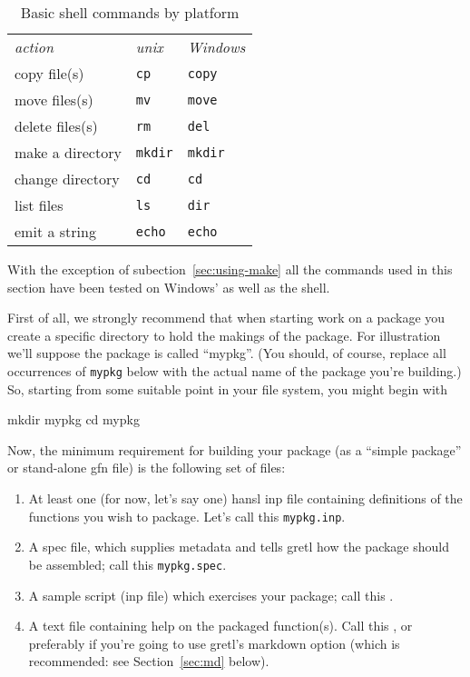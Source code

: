 \documentclass[oneside]{book}
\begin{document}
\begin{table}[htbp]
\centering
\begin{tabular}{lll}
\textit{action} & \textit{unix} & \textit{Windows} \\[4pt]
copy file(s) & \texttt{cp} & \texttt{copy} \\
move files(s) & \texttt{mv} & \texttt{move} \\
delete files(s) & \texttt{rm} & \texttt{del} \\
make a directory & \texttt{mkdir} & \texttt{mkdir} \\
change directory & \texttt{cd} & \texttt{cd} \\
list files & \texttt{ls} & \texttt{dir} \\
emit a string & \texttt{echo} & \texttt{echo}
\end{tabular}
\caption{Basic shell commands by platform}
\label{tab:basics}
\end{table}

With the exception of subection~\ref{sec:using-make} all the commands
used in this section have been tested on Windows'  as
well as the  shell.

First of all, we strongly recommend that when starting work on a
package you create a specific directory to hold the makings of the
package. For illustration we'll suppose the package is called
``mypkg''. (You should, of course, replace all occurrences of
\texttt{mypkg} below with the actual name of the package you're
building.) So, starting from some suitable point in your file system,
you might begin with
%
\begin{code}
mkdir mypkg
cd mypkg
\end{code}

Now, the minimum requirement for building your package (as a ``simple
package'' or stand-alone \textsf{gfn} file) is the following set of
files:
\begin{enumerate}
\item At least one (for now, let's say one) hansl \textsf{inp} file
  containing definitions of the functions you wish to package. Let's
  call this \texttt{mypkg.inp}.
\item A \textsf{spec} file, which supplies metadata and tells gretl how the
  package should be assembled; call this \texttt{mypkg.spec}.
\item A sample script (\textsf{inp} file) which exercises your
  package; call this .
\item A text file containing help on the packaged function(s). Call
  this , or preferably 
  if you're going to use gretl's markdown option (which is
  recommended: see Section~\ref{sec:md} below).
\end{enumerate}
\end{document}
